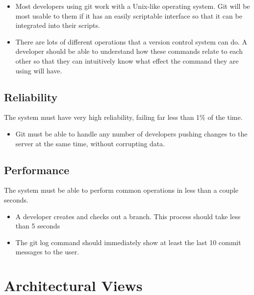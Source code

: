 \documentclass[12pt]{article}
\begin{document}
\begin{itemize}
\item Most developers using git work with a Unix-like operating system. Git will be most usable to them if it has an easily scriptable interface so that it can be integrated into their scripts.
\item There are lots of different operations that a version control system can do. A developer should be able to understand how these commands relate to each other so that they can intuitively know what effect the command they are using will have.
\end{itemize}

\subsection{Reliability}
The system must have very high reliability, failing far less than 1\% of the time.

\begin{itemize}
\item Git must be able to handle any number of developers pushing changes to the server at the same time, without corrupting data.
\end{itemize}

\subsection{Performance}
The system must be able to perform common operations in less than a couple seconds.

\begin{itemize}
\item A developer creates and checks out a branch. This process should take less than 5 seconds
\item The git log command should immediately show at least the last 10 commit messages to the user.
\end{itemize}

\section{Architectural Views}
\end{document}
